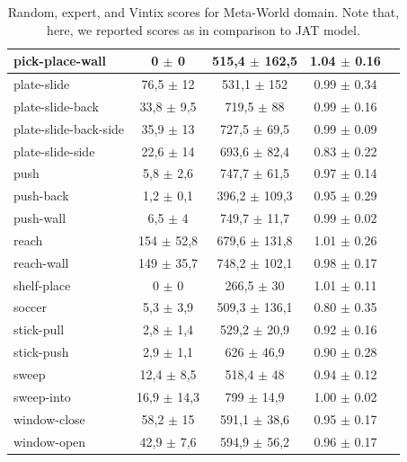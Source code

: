\documentclass{article}
\theoremstyle{plain}
\theoremstyle{definition}
\theoremstyle{remark}
\begin{document}
\begin{table}[H]
{\begin{tabular}{|l|c|c|c|c|}
pick-place-wall           & 0 $\pm$ 0         & 515,4 $\pm$ 162,5 &               1.04 $\pm$ 0.16     \\ \hline
plate-slide               & 76,5 $\pm$ 12     & 531,1 $\pm$ 152   &               0.99 $\pm$ 0.34     \\ \hline
plate-slide-back          & 33,8 $\pm$ 9,5    & 719,5 $\pm$ 88    &               0.99 $\pm$ 0.16     \\ \hline
plate-slide-back-side     & 35,9 $\pm$ 13     & 727,5 $\pm$ 69,5  &               0.99 $\pm$ 0.09     \\ \hline
plate-slide-side          & 22,6 $\pm$ 14     & 693,6 $\pm$ 82,4  &               0.83 $\pm$ 0.22     \\ \hline
push                      & 5,8 $\pm$ 2,6     & 747,7 $\pm$ 61,5  &               0.97 $\pm$ 0.14     \\ \hline
push-back                 & 1,2 $\pm$ 0,1     & 396,2 $\pm$ 109,3 &               0.95 $\pm$ 0.29     \\ \hline
push-wall                 & 6,5 $\pm$ 4       & 749,7 $\pm$ 11,7  &               0.99 $\pm$ 0.02     \\ \hline
reach                     & 154 $\pm$ 52,8    & 679,6 $\pm$ 131,8 &               1.01 $\pm$ 0.26     \\ \hline
reach-wall                & 149 $\pm$ 35,7    & 748,2 $\pm$ 102,1 &               0.98 $\pm$ 0.17     \\ \hline
shelf-place               & 0 $\pm$ 0         & 266,5 $\pm$ 30    &               1.01 $\pm$ 0.11     \\ \hline
soccer                    & 5,3 $\pm$ 3,9     & 509,3 $\pm$ 136,1 &               0.80 $\pm$ 0.35     \\ \hline
stick-pull                & 2,8 $\pm$ 1,4     & 529,2 $\pm$ 20,9  &               0.92 $\pm$ 0.16     \\ \hline
stick-push                & 2,9 $\pm$ 1,1     & 626 $\pm$ 46,9    &               0.90 $\pm$ 0.28     \\ \hline
sweep                     & 12,4 $\pm$ 8,5    & 518,4 $\pm$ 48    &               0.94 $\pm$ 0.12     \\ \hline
sweep-into                & 16,9 $\pm$ 14,3   & 799 $\pm$ 14,9    &               1.00 $\pm$ 0.02     \\ \hline
window-close              & 58,2 $\pm$ 15     & 591,1 $\pm$ 38,6  &               0.95 $\pm$ 0.17     \\ \hline
window-open               & 42,9 $\pm$ 7,6    & 594,9 $\pm$ 56,2  &               0.96 $\pm$ 0.17     \\ \hline
\end{tabular}}
\caption{Random, expert, and Vintix scores for Meta-World domain. Note that, here, we reported scores as in comparison to JAT model.}
\end{table}
\end{document}
